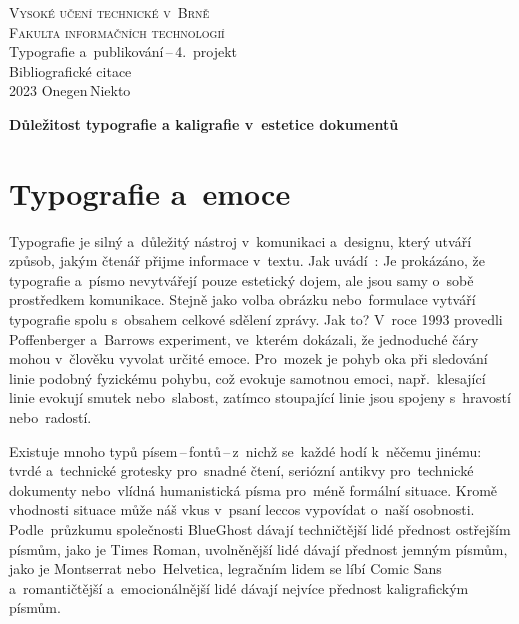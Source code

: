 \documentclass[a4paper, 11pt]{article}
\begin{document}
\begin{titlepage}
	\begin{center}
		{\Huge \textsc{Vysoké učení technické v~Brně}\\}
		{\huge \textsc{Fakulta informačních technologií}\\}
		{\LARGE Typografie a~publikování\,--\,4.\ projekt\\}
		{\Huge Bibliografické citace\\}
		{\Large 2023 \hfill Onegen\,Niekto}
	\end{center}
\end{titlepage}

\begin{center}
	\Large
	\textbf{Důležitost typografie a kaligrafie v~estetice dokumentů}
	\bigskip
\end{center}
\section*{Typografie a~emoce}

Typografie je silný a~důležitý nástroj v~komunikaci a~designu, který utváří
způsob, jakým čtenář přijme informace v~textu.
Jak uvádí~\textcite{Koch:2012:EmotionIT}: 
Je prokázáno, že typografie a~písmo nevytvářejí pouze estetický dojem,
ale jsou samy o~sobě prostředkem komunikace. Stejně jako volba obrázku
nebo~formulace vytváří typografie spolu s~obsahem
celkové sdělení zprávy. \parencite{Pilka:2019:CharakterPisma}
Jak to? V~roce 1993 provedli Poffenberger a~Barrows experiment,
ve~kterém dokázali, že jednoduché čáry mohou v~člověku vyvolat určité emoce.
Pro~mozek je pohyb oka při sledování linie podobný fyzickému pohybu,
což evokuje samotnou emoci, např.~klesající linie evokují smutek nebo~slabost,
zatímco stoupající linie jsou spojeny s~hravostí nebo~radostí.
\parencite{Sladovnikova:2021:EmoceTextu}

Existuje mnoho typů písem\,--\,fontů\,--\,z~nichž se~každé hodí k~něčemu
jinému: tvrdé a~technické grotesky pro~snadné čtení, seriózní antikvy
pro~technické dokumenty nebo~vlídná humanistická písma pro~méně formální situace.
\parencite{Samara:2010:ZakladyDesignu}
Kromě vhodnosti situace může náš vkus v~psaní leccos vypovídat o~naší osobnosti.
Podle~průzkumu společnosti BlueGhost dávají techničtější lidé přednost ostřejším
písmům, jako je Times Roman, uvolněnější lidé dávají přednost jemným písmům,
jako je Montserrat nebo~Helvetica, legračním lidem se líbí Comic Sans
a~romantičtější a~emocionálnější lidé dávají nejvíce přednost kaligrafickým písmům.
\parencite{Pilka:2019:CharakterPisma}

\newpage
\renewcommand{\refname}{Literatúra}
\printbibliography{}
\end{document}
